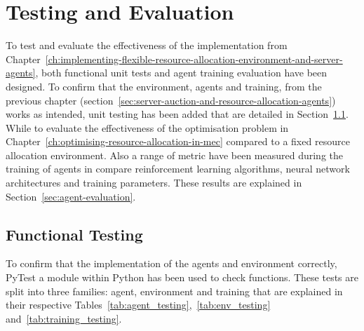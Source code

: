 
\chapter{Testing and Evaluation}
\label{ch:testing-and-evaluation}
To test and evaluate the effectiveness of the implementation from
Chapter~\ref{ch:implementing-flexible-resource-allocation-environment-and-server-agents}, both functional unit tests
and agent training evaluation have been designed. To confirm that the environment, agents and training, from the
previous chapter (section~\ref{sec:server-auction-and-resource-allocation-agents}) works as intended, unit testing has
been added that are detailed in Section~\ref{sec:functional-testing}. While to evaluate the effectiveness of the
optimisation problem in Chapter~\ref{ch:optimising-resource-allocation-in-mec} compared to a fixed resource allocation
environment. Also a range of metric have been measured during the training of agents in compare reinforcement learning
algorithms, neural network architectures and training parameters. These results are explained in
Section~\ref{sec:agent-evaluation}.

\section{Functional Testing}
\label{sec:functional-testing}
To confirm that the implementation of the agents and environment correctly, PyTest a module within Python has been used
to check functions. These tests are split into three families: agent, environment and training that are
explained in their respective Tables~\ref{tab:agent_testing},~\ref{tab:env_testing} and~\ref{tab:training_testing}.

